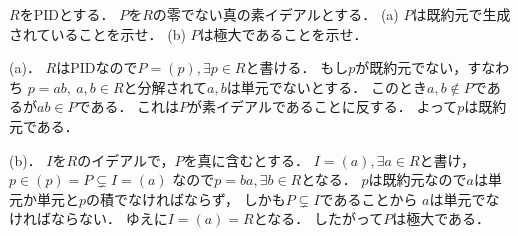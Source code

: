 \begin{prob}
  $R$をPIDとする．
  $P$を$R$の零でない真の素イデアルとする．
  (a) $P$は既約元で生成されていることを示せ．
  (b) $P$は極大であることを示せ．
\end{prob}
\begin{ans}
  (a)．
  $R$はPIDなので$P = (p), \exists p \in R$と書ける．
  もし$p$が既約元でない，すなわち
  $p = ab, \ a,b\in R$と分解されて$a,b$は単元でないとする．
  このとき$a,b \not\in P$であるが$ab \in P$である．
  これは$P$が素イデアルであることに反する．
  よって$p$は既約元である．

  (b)．
  $I$を$R$のイデアルで，$P$を真に含むとする．
  $I = (a), \exists a\in R$と書け，
  $p \in (p) = P \subsetneq I = (a)$
  なので$p = ba, \exists b \in R$となる．
  $p$は既約元なので$a$は単元か単元と$p$の積でなければならず，
  しかも$P \subsetneq I$であることから
  $a$は単元でなければならない．
  ゆえに$I = (a) = R$となる．
  したがって$P$は極大である．
\end{ans}
